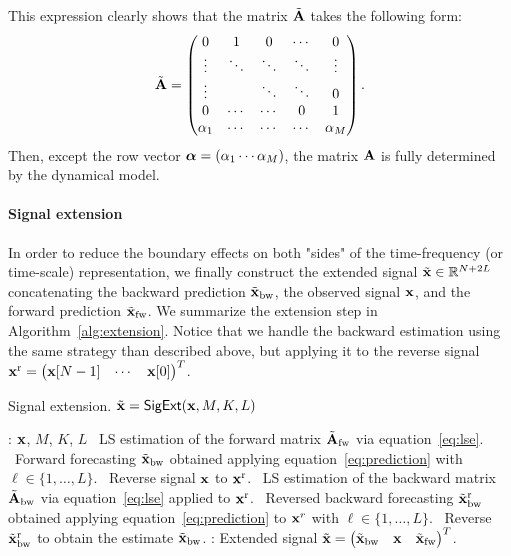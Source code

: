\begin{remark}
This expression clearly shows that the matrix $\tilde{{\mathbf A}}$ takes the following form:
\[
\tilde{{\mathbf A}} =
\begin{pmatrix}
0       & 1       & 0      & \cdots & 0      \\
\vdots  & \ddots  & \ddots & \ddots & \vdots  \\
\vdots  &         & \ddots & \ddots & 0  \\
0       & \cdots  & \cdots & 0      & 1  \\
\alpha_1& \cdots  & \cdots & \cdots & \alpha_M  \\
\end{pmatrix}.
\]
Then, except the row vector $\boldsymbol{\alpha} = \left(\alpha_1 \cdots\alpha_M\right)$, the matrix ${\mathbf A}$ is fully determined by the dynamical model.
\end{remark}

\paragraph{Signal extension} In order to reduce the boundary effects on both "sides" of the time-frequency (or time-scale) representation, we finally construct the extended signal $\tilde{{\mathbf x}}\in{\mathbb R}^{N+2L}$ concatenating the backward prediction $\tilde{{\mathbf x}}_{\rm bw}$, the observed signal ${\mathbf x}$, and the forward prediction $\tilde{{\mathbf x}}_{\rm fw}$. We summarize the extension step in Algorithm~\ref{alg:extension}. Notice that we handle the backward estimation using the same strategy than described above, but applying it to the reverse signal ${\mathbf x}^{\rm r} = \begin{pmatrix} {\mathbf x}[N-1] & \cdots & {\mathbf x}[0] \end{pmatrix}^T$.

\begin{algorithm}
\caption{Signal extension. $\tilde{{\mathbf x}} = \mathsf{SigExt}({\mathbf x},M,K,L)$}
\label{alg:extension}
\begin{algorithmic}
: ${\mathbf x}$, $M$, $K$, $L$
\STATE 
{}
\STATE \quad\textbullet\ LS estimation of the forward matrix $\tilde{{\mathbf A}}_{\rm fw}$ via equation~\eqref{eq:lse}.
\STATE \quad\textbullet\ Forward forecasting $\tilde{{\mathbf x}}_{\rm bw}$ obtained applying equation~\eqref{eq:prediction} with $\ell\in\{1,\ldots,L\}$.
\STATE 
{}
\STATE \quad\textbullet\ Reverse signal ${\mathbf x}$ to ${\mathbf x}^{\rm r}$. 
\STATE \quad\textbullet\ LS estimation of the backward matrix $\tilde{{\mathbf A}}_{\rm bw}$ via equation~\eqref{eq:lse} applied to ${\mathbf x}^{\rm r}$.
\STATE \quad\textbullet\ Reversed backward forecasting $\tilde{{\mathbf x}}_{\rm bw}^{\rm r}$ obtained applying equation~\eqref{eq:prediction} to ${\mathbf x}^r$ with $\ell\in\{1,\ldots,L\}$.
\STATE \quad\textbullet\ Reverse $\tilde{{\mathbf x}}_{\rm bw}^{\rm r}$ to obtain the estimate $\tilde{{\mathbf x}}_{\rm bw}$.
\STATE 
{}: Extended signal $\tilde{{\mathbf x}} = \begin{pmatrix} \tilde{{\mathbf x}}_{\rm bw}  & {\mathbf x} & \tilde{{\mathbf x}}_{\rm fw}\end{pmatrix}^T$.
\end{algorithmic}
\end{algorithm}

